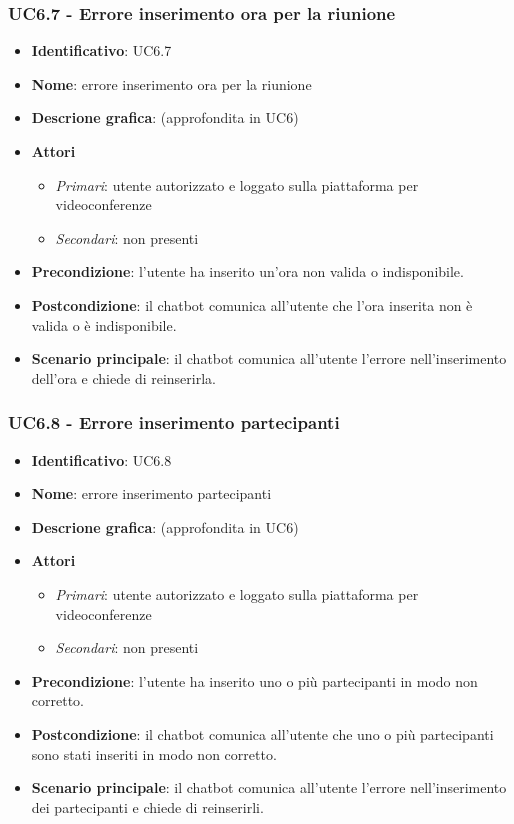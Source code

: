 \subsubsection{UC6.7 - Errore inserimento ora per la riunione}
\begin{itemize}
    \item \textbf{Identificativo}: UC6.7
    \item \textbf{Nome}: errore inserimento ora per la riunione
    \item \textbf{Descrione grafica}: (approfondita in UC6)
    \item \textbf{Attori}
 \begin{itemize} 
    \item \textit{Primari}: utente autorizzato e loggato sulla piattaforma per videoconferenze
    \item \textit{Secondari}: non presenti
 \end{itemize}
 \item \textbf{Precondizione}: l'utente ha inserito un'ora non valida o indisponibile.
 \item \textbf{Postcondizione}: il chatbot comunica all'utente che l'ora inserita non è valida o è indisponibile.
 \item \textbf{Scenario principale}: il chatbot comunica all'utente l'errore nell'inserimento dell'ora e chiede di reinserirla.
\end{itemize}
\subsubsection{UC6.8 - Errore inserimento partecipanti}
\begin{itemize}
    \item \textbf{Identificativo}: UC6.8
    \item \textbf{Nome}: errore inserimento partecipanti
    \item \textbf{Descrione grafica}: (approfondita in UC6)
    \item \textbf{Attori}
 \begin{itemize} 
    \item \textit{Primari}: utente autorizzato e loggato sulla piattaforma per videoconferenze
    \item \textit{Secondari}: non presenti
 \end{itemize}
 \item \textbf{Precondizione}: l'utente ha inserito uno o più partecipanti in modo non corretto.
 \item \textbf{Postcondizione}: il chatbot comunica all'utente che uno o più partecipanti sono stati inseriti in modo non corretto.
 \item \textbf{Scenario principale}: il chatbot comunica all'utente l'errore nell'inserimento dei partecipanti e chiede di reinserirli.
\end{itemize}